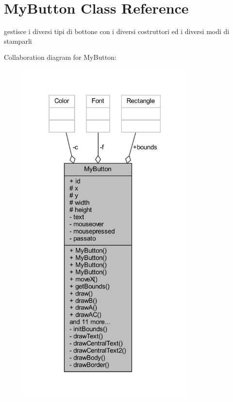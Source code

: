 \hypertarget{classui_1_1_my_button}{}\section{My\+Button Class Reference}
\label{classui_1_1_my_button}


gestisce i diversi tipi di bottone con i diversi costruttori ed i diversi modi di stamparli  




Collaboration diagram for My\+Button\+:\nopagebreak
\begin{figure}[H]
\begin{center}
\leavevmode
\includegraphics[width=252pt]{classui_1_1_my_button__coll__graph}
\end{center}
\end{figure}

